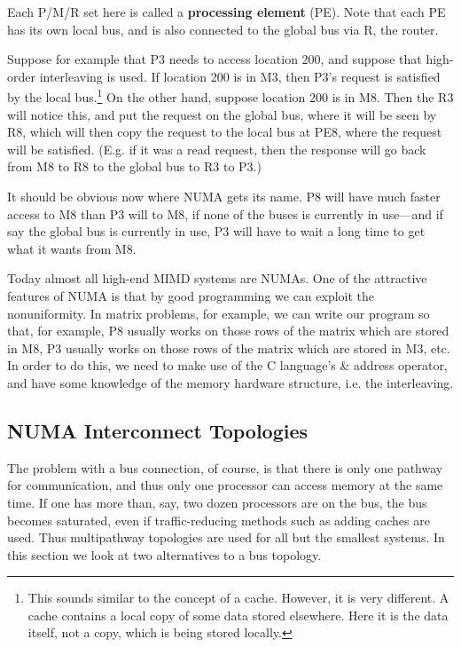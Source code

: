 Each P/M/R set here is called a \textbf{processing element} (PE). Note
that each PE has its own local bus, and is also connected to the global
bus via R, the router.

Suppose for example that P3 needs to access location 200, and suppose
that high-order interleaving is used.  If location 200 is in M3, then
P3's request is satisfied by the local bus.\footnote{This sounds similar
to the concept of a cache. However, it is very different.  A cache
contains a local copy of some data stored elsewhere.  Here it is the
data itself, not a copy, which is being stored locally.} On the other
hand, suppose location 200 is in M8. Then the R3 will notice this, and
put the request on the global bus, where it will be seen by R8, which
will then copy the request to the local bus at PE8, where the request
will be satisfied.  (E.g. if it was a read request, then the response
will go back from M8 to R8 to the global bus to R3 to P3.)

It should be obvious now where NUMA gets its name. P8 will have much
faster access to M8 than P3 will to M8, if none of the buses is
currently in use---and if say the global bus is currently in use, P3
will have to wait a long time to get what it wants from M8.

Today almost all high-end MIMD systems are NUMAs.  One of the attractive
features of NUMA is that by good programming we can exploit the
nonuniformity.  In matrix problems, for example, we can write our
program so that, for example, P8 usually works on those rows of the 
matrix which are stored in M8, P3 usually works on those rows of the
matrix which are stored in M3, etc. In order to do this, we need to make
use of the C language's \& address operator, and have some knowledge of
the memory hardware structure, i.e. the interleaving.

\subsection{NUMA Interconnect Topologies}

The problem with a bus connection, of course, is that there is only one
pathway for communication, and thus only one processor can access memory
at the same time.  If one has more than, say, two dozen processors are
on the bus, the bus becomes saturated, even if traffic-reducing methods
such as adding caches are used. Thus multipathway topologies are used
for all but the smallest systems.  In this section we look at two
alternatives to a bus topology. 


